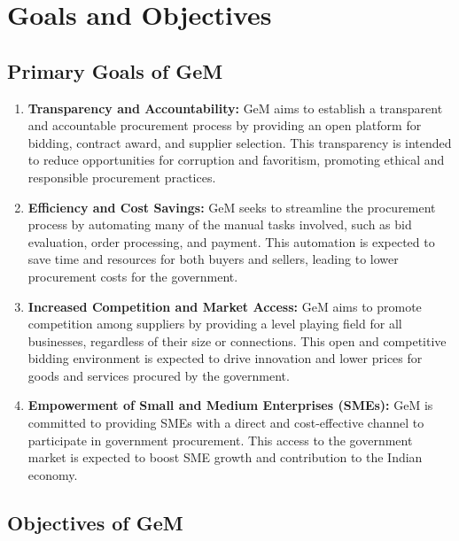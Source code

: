 \section{Goals and Objectives}

\subsection{Primary Goals of GeM}

\begin{enumerate}
    \item \textbf{Transparency and Accountability:} GeM aims to establish a transparent and accountable procurement process by providing an open platform for bidding, contract award, and supplier selection. This transparency is intended to reduce opportunities for corruption and favoritism, promoting ethical and responsible procurement practices.
    
    \item \textbf{Efficiency and Cost Savings:} GeM seeks to streamline the procurement process by automating many of the manual tasks involved, such as bid evaluation, order processing, and payment. This automation is expected to save time and resources for both buyers and sellers, leading to lower procurement costs for the government.
    
    \item \textbf{Increased Competition and Market Access:} GeM aims to promote competition among suppliers by providing a level playing field for all businesses, regardless of their size or connections. This open and competitive bidding environment is expected to drive innovation and lower prices for goods and services procured by the government.
    
    \item \textbf{Empowerment of Small and Medium Enterprises (SMEs):} GeM is committed to providing SMEs with a direct and cost-effective channel to participate in government procurement. This access to the government market is expected to boost SME growth and contribution to the Indian economy.
\end{enumerate}

\subsection{Objectives of GeM}

